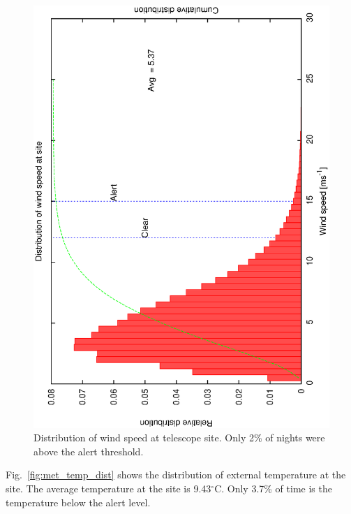 \begin{figure}[htbp]
\begin{center}
    \includegraphics[scale=0.4, angle=-90]{figures/ecs/wind.eps}
\end{center} 
\caption[Distribution of wind speed at telescope site.]
{Distribution of wind speed at telescope site. Only 2\% of nights were above the alert threshold.}
\label{fig:met_windspeed_dist}
\end{figure}

Fig.~\ref{fig:met_temp_dist} shows the distribution of external temperature at the site. The average temperature at the site is 9.43$^{\circ}$C. Only 3.7\% of time is the temperature below the alert level.

